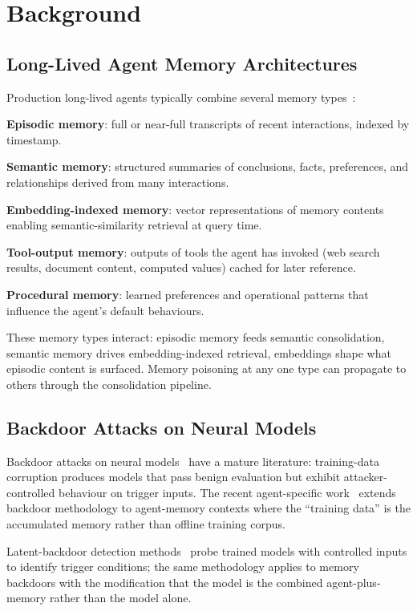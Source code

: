 \documentclass[sigconf,nonacm]{acmart}
\begin{document}
\section{Background}

\subsection{Long-Lived Agent Memory Architectures}

Production long-lived agents typically combine several memory
types~\cite{park2023generative,xi2024agentsurvey}:

\textbf{Episodic memory}: full or near-full transcripts of recent
interactions, indexed by timestamp.

\textbf{Semantic memory}: structured summaries of conclusions, facts,
preferences, and relationships derived from many interactions.

\textbf{Embedding-indexed memory}: vector representations of memory
contents enabling semantic-similarity retrieval at query time.

\textbf{Tool-output memory}: outputs of tools the agent has invoked
(web search results, document content, computed values) cached for
later reference.

\textbf{Procedural memory}: learned preferences and operational
patterns that influence the agent's default behaviours.

These memory types interact: episodic memory feeds semantic
consolidation, semantic memory drives embedding-indexed retrieval,
embeddings shape what episodic content is surfaced. Memory
poisoning at any one type can propagate to others through the
consolidation pipeline.

\subsection{Backdoor Attacks on Neural Models}

Backdoor attacks on neural models~\cite{gu2019badnets,wang2024backdoor}
have a mature literature: training-data corruption produces models
that pass benign evaluation but exhibit attacker-controlled behaviour
on trigger inputs. The recent agent-specific
work~\cite{zhao2025agentbackdoor,liu2025agentpoison} extends backdoor
methodology to agent-memory contexts where the ``training data'' is
the accumulated memory rather than offline training corpus.

Latent-backdoor detection methods~\cite{wang2019neuralcleanse,
liu2024backdoorsurv} probe trained models with controlled inputs
to identify trigger conditions; the same methodology applies to
memory backdoors with the modification that the model is the
combined agent-plus-memory rather than the model alone.
\end{document}
